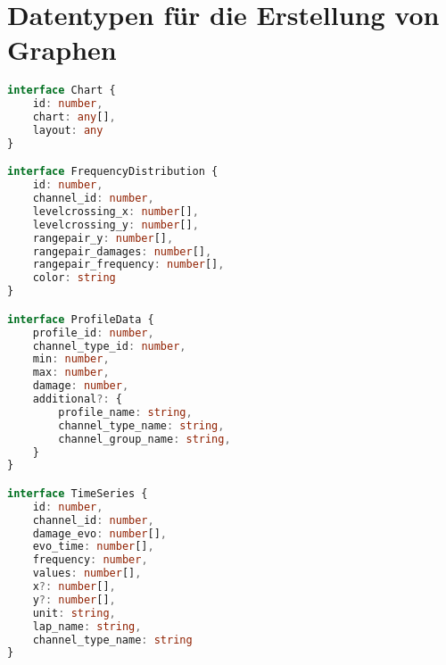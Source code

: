 \section{Datentypen für die Erstellung von Graphen}
\label{appendix:graph_types}
\begin{lstlisting}[language=Typescript]
interface Chart {
    id: number,
    chart: any[],
    layout: any
}

interface FrequencyDistribution {
    id: number,
    channel_id: number,
    levelcrossing_x: number[],
    levelcrossing_y: number[],
    rangepair_y: number[],
    rangepair_damages: number[],
    rangepair_frequency: number[],
    color: string
}

interface ProfileData {
    profile_id: number,
    channel_type_id: number,
    min: number,
    max: number,
    damage: number,
    additional?: {
        profile_name: string,
        channel_type_name: string,
        channel_group_name: string,
    }
}

interface TimeSeries {
    id: number,
    channel_id: number,
    damage_evo: number[],
    evo_time: number[],
    frequency: number,
    values: number[],
    x?: number[],
    y?: number[],
    unit: string,
    lap_name: string,
    channel_type_name: string
}
\end{lstlisting}